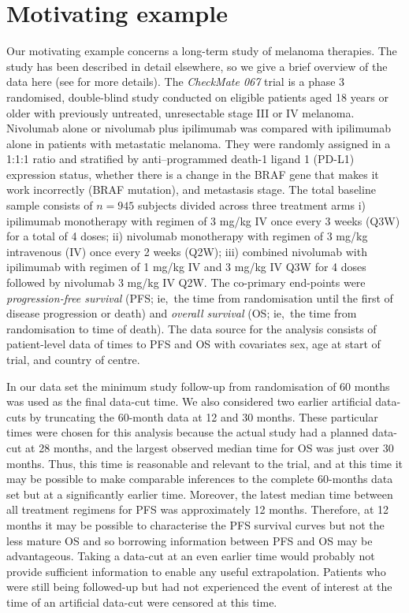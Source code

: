 \documentclass[AMA,STIX1COL]{WileyNJD-v2}
\begin{document}
\section{Motivating example}\label{sec:example}
Our motivating example concerns a long-term study of melanoma therapies.
The study has been described in detail elsewhere, so we give a brief overview of the data here (see \citep{Wolchok2017, Larkin2019, Hodi2018} for more details).
The \textit{CheckMate 067} trial is a phase 3 randomised, double-blind study conducted on eligible patients aged 18 years or older with previously untreated, unresectable stage III or IV melanoma.
Nivolumab alone or nivolumab plus ipilimumab was compared with ipilimumab alone in patients with metastatic melanoma.
They were randomly assigned in a 1:1:1 ratio and stratified by anti–programmed death-1 ligand 1 (PD-L1) expression status, whether there is a change in the BRAF gene that makes it work incorrectly (BRAF mutation), and metastasis stage.
The total baseline sample consists of $n = 945$ subjects divided across three treatment arms
i) ipilimumab monotherapy with regimen of 3 mg/kg IV once every 3 weeks (Q3W) for a total of 4 doses;
ii) nivolumab monotherapy with regimen of 3 mg/kg intravenous (IV) once every 2 weeks (Q2W);
iii) combined nivolumab with ipilimumab with regimen of 1 mg/kg IV and 3 mg/kg IV Q3W for 4 doses followed by nivolumab 3 mg/kg IV Q2W.
The co-primary end-points were \textit{progression-free survival} (PFS; ie,~the time from randomisation until the first of disease progression or death) and \textit{overall survival} (OS; ie,~the time from randomisation to time of death).
The data source for the analysis consists of patient-level data of times to PFS and OS with covariates sex, age at start of trial, and country of centre.

In our data set the minimum study follow-up from randomisation of 60 months was used as the final data-cut time.
We also considered two earlier artificial data-cuts by truncating the 60-month data at 12 and 30 months.
These particular times were chosen for this analysis because the actual study had a planned data-cut at 28 months, and the largest observed median time for OS was just over 30 months. Thus, this time is reasonable and relevant to the trial, and at this time it may be possible to make comparable inferences to the complete 60-months data set but at a significantly earlier time.
Moreover, the latest median time between all treatment regimens for PFS was approximately 12 months. Therefore, at 12 months it may be possible to characterise the PFS survival curves but not the less mature OS and so borrowing information between PFS and OS may be advantageous. Taking a data-cut at an even earlier time would probably not provide sufficient information to enable any useful extrapolation.
Patients who were still being followed-up but had not experienced the event of interest at the time of an artificial data-cut were censored at this time.
\end{document}
